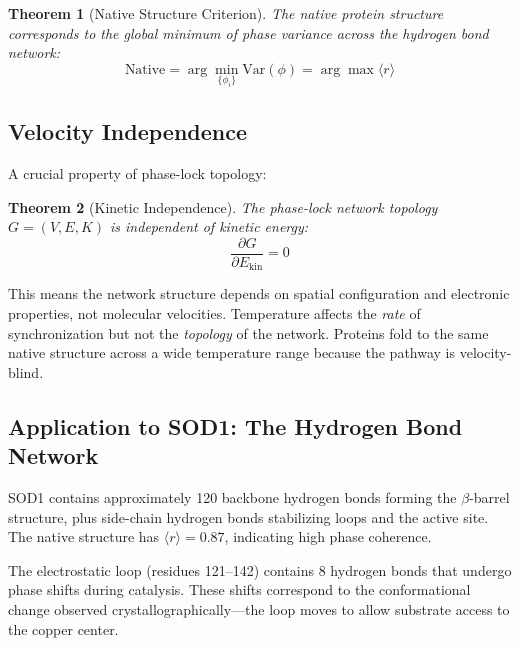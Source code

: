 \documentclass[twocolumn,aps,prx,superscriptaddress,longbibliography]{revtex4-2}
\newtheorem{theorem}{Theorem}[section]
\theoremstyle{remark}
\newcommand{\orderpar}{\langle r \rangle}
\begin{document}
\begin{theorem}[Native Structure Criterion]
\label{thm:native}
The native protein structure corresponds to the global minimum of phase
variance across the hydrogen bond network:
\begin{equation}
\text{Native} = \arg\min_{\{\phi_i\}} \text{Var}(\phi) = \arg\max \orderpar
\label{eq:native}
\end{equation}
\end{theorem}

\subsection{Velocity Independence}

A crucial property of phase-lock topology:

\begin{theorem}[Kinetic Independence]
\label{thm:kinetic}
The phase-lock network topology $G = (V, E, K)$ is independent of
kinetic energy:
\begin{equation}
\frac{\partial G}{\partial E_\text{kin}} = 0
\label{eq:kinetic_indep}
\end{equation}
\end{theorem}

This means the network structure depends on spatial configuration and
electronic properties, not molecular velocities. Temperature affects the
\textit{rate} of synchronization but not the \textit{topology} of the
network. Proteins fold to the same native structure across a wide
temperature range because the pathway is velocity-blind.

\subsection{Application to SOD1: The Hydrogen Bond Network}

SOD1 contains approximately 120 backbone hydrogen bonds forming the
$\beta$-barrel structure, plus side-chain hydrogen bonds stabilizing
loops and the active site. The native structure has $\orderpar = 0.87$,
indicating high phase coherence.

The electrostatic loop (residues 121--142) contains 8 hydrogen bonds
that undergo phase shifts during catalysis. These shifts correspond to
the conformational change observed crystallographically---the loop moves
to allow substrate access to the copper center.
\end{document}
